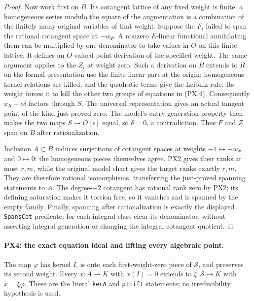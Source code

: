 \begin{proof}
Now work first on $B$.  Its cotangent lattice of any
fixed weight is finite: a homogeneous series modulo the
square of the augmentation is a combination of the
finitely many original variables of that weight.  Suppose
the $F_i$ failed to span the rational cotangent space at
$-w_\Psi$.  A nonzero $E$-linear functional annihilating
them can be multiplied by one denominator to take values
in $O$ on this finite lattice.  It defines an $O$-valued
point derivation of the specified weight.  The same
argument applies to the $Z_i$ at weight zero.
Such a derivation on $B$ extends to $R$: on the formal
presentation use the finite linear part at the origin;
homogeneous kernel relations are killed, and the
quadratic terms give the Leibniz rule.  Its weight forces
it to kill the other two groups of equations in (PX.4).
Consequently $x_R+\epsilon\delta$ factors through $S$.
The universal representation gives an actual tangent
point of the kind just proved zero.  The model's
entry-generation property then makes the two maps
$S\to O[\epsilon]$ equal, so $\delta=0$, a contradiction.
Thus $F$ and $Z$ span on $B$ after rationalization.

Inclusion $A\subset B$ induces surjections of cotangent
spaces at weights $-1\mapsto-w_\Psi$ and $0\mapsto0$:
the homogeneous pieces themselves agree.  PX2 gives
their ranks at most $r,m$, while the original model
chart gives the target ranks exactly $r,m$.
They are therefore rational isomorphisms, transferring
the just-proved spanning statements to $A$.  The
degree-$-2$ cotangent has rational rank zero by PX2;
its defining saturation makes it torsion free, so it
vanishes and is spanned by the empty family.  Finally,
spanning after rationalization is exactly the displayed
\texttt{SpansCot} predicate: for each integral class
clear its denominator, without asserting integral
generation or changing the integral cotangent quotient.
\end{proof}

\paragraph{PX4: the exact equation ideal and lifting every algebraic point.}
\label{claim:PX4}
The map $\varphi$ has kernel $I$, is onto each
first-weight-zero piece of $\mathcal S$, and preserves
its second weight.  Every $x:A\to K$ with $x(I)=0$
extends to $\xi:\mathcal S\to K$ with $x=\xi\varphi$.
These are the literal \texttt{kerA} and \texttt{ptLift}
statements; no irreducibility hypothesis is used.

